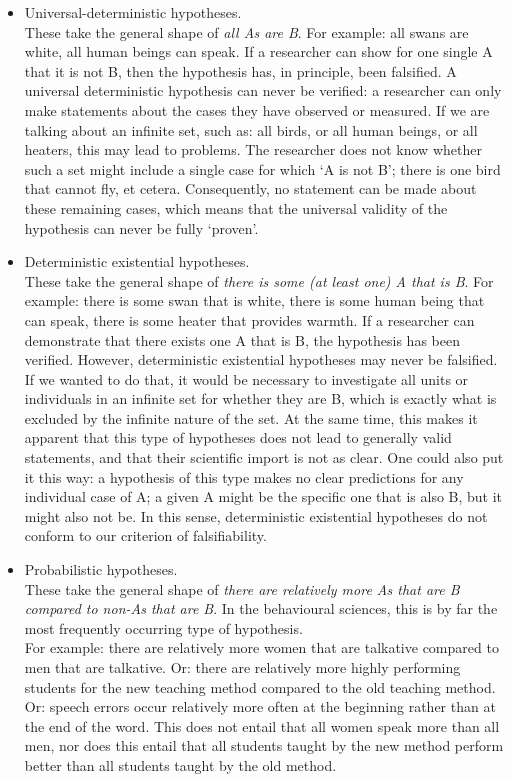 \documentclass[
]{book}
\begin{document}
\begin{itemize}
\item
  Universal-deterministic hypotheses.\\
  These take the general shape of \emph{all As are B}. For example: all swans are white, all human beings can speak. If a researcher can show for one single A that it is not B, then the hypothesis has, in principle, been falsified. A universal deterministic hypothesis can never be verified: a researcher can only make statements about the cases they have observed or measured. If we are talking about an infinite set, such as: all birds, or all human beings, or all heaters, this may lead to problems. The researcher does not know whether such a set might include a single case for which `A is not B'; there is one bird that cannot fly, et cetera. Consequently, no statement can be made about these remaining cases, which means that the universal validity of the hypothesis can never be fully `proven'.
\item
  Deterministic existential hypotheses.\\
  These take the general shape of \emph{there is some (at least one) A that is B}. For example: there is some swan that is white, there is some human being that can speak, there is some heater that provides warmth. If a researcher can demonstrate that there exists one A that is B, the hypothesis has been verified. However, deterministic existential hypotheses may never be falsified. If we wanted to do that, it would be necessary to investigate all units or individuals in an infinite set for whether they are B, which is exactly what is excluded by the infinite nature of the set. At the same time, this makes it apparent that this type of hypotheses does not lead to generally valid statements, and that their scientific import is not as clear. One could also put it this way: a hypothesis of this type makes no clear predictions for any individual case of A; a given A might be the specific one that is also B, but it might also not be. In this sense, deterministic existential hypotheses do not conform to our criterion of falsifiability.
\item
  Probabilistic hypotheses.\\
  These take the general shape of \emph{there are relatively more As that are B compared to non-As that are B}. In the behavioural sciences, this is by far the most frequently occurring type of hypothesis.\\
  For example: there are relatively more women that are talkative compared to men that are talkative. Or: there are relatively more highly performing students for the new teaching method compared to the old teaching method. Or: speech errors occur relatively more often at the beginning rather than at the end of the word. This does not entail that all women speak more than all men, nor does this entail that all students taught by the new method perform better than all students taught by the old method.
\end{itemize}
\end{document}
